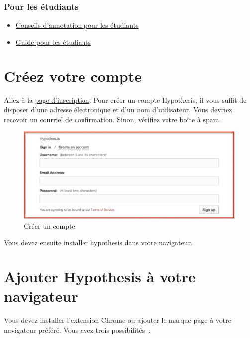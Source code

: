 \documentclass[
]{book}
\providecommand{\tightlist}{%
  \setlength{\itemsep}{0pt}\setlength{\parskip}{0pt}}
\begin{document}
\hypertarget{pour-les-uxe9tudiants}{%
\subsection*{Pour les étudiants}\label{pour-les-uxe9tudiants}}

\begin{itemize}
\tightlist
\item
  \href{https://web.hypothes.is/annotation-tips-for-students/}{Conseils d'annotation pour les étudiants}
\item
  \href{https://web.hypothes.is/student-resource-guide/}{Guide pour les étudiants}
\end{itemize}

\hypertarget{s1}{%
\chapter{Créez votre compte}\label{s1}}

Allez à la \href{https://hypothes.is/signup}{page d'inscription}. Pour créer un compte Hypothesis, il vous suffit de disposer d'une adresse électronique et d'un nom d'utilisateur. Vous devriez recevoir un courriel de confirmation. Sinon, vérifiez votre boîte à spam.

\begin{figure}
\centering
\includegraphics{img/08a7089161c6c5bd7205aa71e717ab6e.png}
\caption{Créer un compte}
\end{figure}

Vous devez ensuite \protect\hyperlink{s2}{installer hypothesis} dans votre navigateur.

\hypertarget{s2}{%
\chapter{Ajouter Hypothesis à votre navigateur}\label{s2}}

Vous devez installer l'extension Chrome ou ajouter le marque-page à votre navigateur préféré. Vous avez trois possibilités~:
\end{document}
